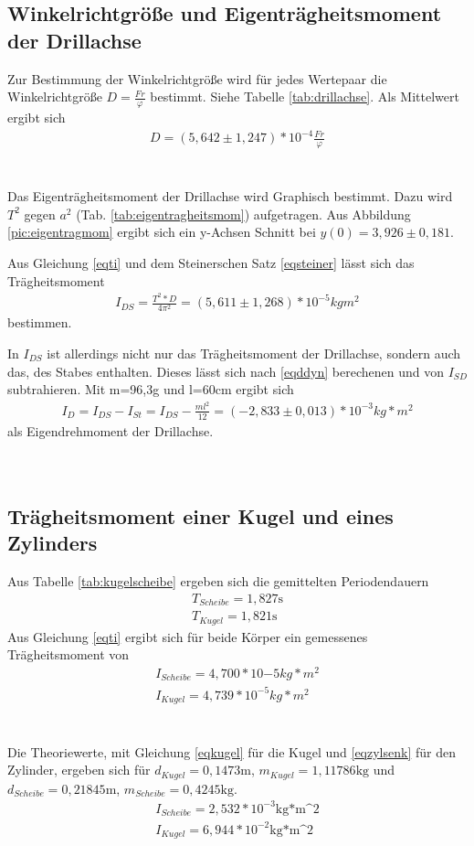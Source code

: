 \subsection{Winkelrichtgröße und Eigenträgheitsmoment der Drillachse}

Zur Bestimmung der Winkelrichtgröße wird für jedes Wertepaar die Winkelrichtgröße $D=\frac{Fr}{\varphi}$ bestimmt. Siehe Tabelle \ref{tab:drillachse}. Als Mittelwert ergibt sich
\begin{align}
D=(5,642\pm1,247)*10^{-4}\frac{Fr}{\varphi}
\end{align}
\\
\\


Das Eigenträgheitsmoment der Drillachse wird Graphisch bestimmt. Dazu wird $T^2$ gegen $a^2$ (Tab. \ref{tab:eigentragheitsmom}) aufgetragen. 
Aus Abbildung \ref{pic:eigentragmom} ergibt sich ein y-Achsen Schnitt bei $y(0)=3,926\pm 0,181$.


Aus Gleichung \ref{eqti} und dem Steinerschen Satz \ref{eqsteiner} lässt sich das Trägheitsmoment 
\begin{align}
I_{DS}=\frac{T^2*D}{4\pi^2}=(5,611\pm1,268)*10^{-5}kgm^2
\end{align}
bestimmen.

In $I_{DS}$ ist allerdings nicht nur das Trägheitsmoment der Drillachse, sondern auch das, des Stabes enthalten. Dieses lässt sich nach \ref{eqddyn} berechenen und von $I_{SD}$ subtrahieren. Mit m=96,3g und l=60cm ergibt sich
\begin{align}
I_{D}=I_{DS}-I_{St}=I_{DS}-\frac{ml^2}{12}=(-2,833\pm 0,013)*10^{-3}kg*m^2
\end{align}
als Eigendrehmoment der Drillachse.
\\
\\
\\
\subsection{Trägheitsmoment einer Kugel und eines Zylinders}

Aus Tabelle \ref{tab:kugelscheibe} ergeben sich die gemittelten Periodendauern
\begin{align*}
T_{Scheibe}=1,827\text{s}\\
T_{Kugel}=1,821\text{s}
\end{align*}
Aus Gleichung \ref{eqti} ergibt sich für beide Körper ein gemessenes Trägheitsmoment von
\begin{align}
I_{Scheibe}=4,700*10{-5}kg*m^2\\
I_{Kugel}=4,739*10^{-5}kg*m^2
\end{align}
\\
\\
Die Theoriewerte, mit Gleichung \ref{eqkugel} für die Kugel und \ref{eqzylsenk} für den Zylinder, ergeben sich für $d_{Kugel}= 0,1473\text{m}$, $m_{Kugel}=1,11786\text{kg}$ und $d_{Scheibe}=0,21845\text{m}$, $m_{Scheibe}=0,4245\text{kg}$.
\begin{align*}
I_{Scheibe}=2,532*10^{-3}\text{kg*m^2}\\
I_{Kugel}=6,944*10^{-2}\text{kg*m^2}
\end{align*}
\\
\\
\\
